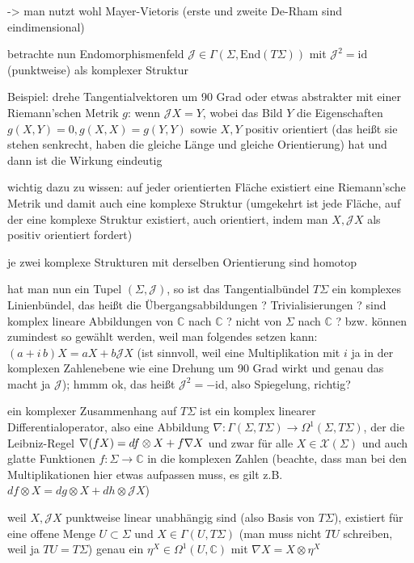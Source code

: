 \documentclass[../H_Analysis_main.tex]{subfiles}
\begin{document}
-> man nutzt wohl Mayer-Vietoris (erste und zweite De-Rham sind eindimensional)


betrachte nun Endomorphismenfeld $\mathcal{J} \in \Gamma(\Sigma, \text{End}(T\Sigma))$ mit $\mathcal{J}^2 = \text{id}$ (punktweise) als komplexer Struktur


Beispiel: drehe Tangentialvektoren um 90 Grad oder etwas abstrakter mit einer Riemann'schen Metrik $g$: wenn $\mathcal{J}X = Y$, wobei das Bild $Y$ die Eigenschaften $g(X, Y) = 0, g(X, X) = g(Y, Y)$ sowie $X, Y$ positiv orientiert (das heißt sie stehen senkrecht, haben die gleiche Länge und gleiche Orientierung) hat und dann ist die Wirkung eindeutig

wichtig dazu zu wissen: auf jeder orientierten Fläche existiert eine Riemann'sche Metrik und damit auch eine komplexe Struktur (umgekehrt ist jede Fläche, auf der eine komplexe Struktur existiert, auch orientiert, indem man $X, \mathcal{J}X$ als positiv orientiert fordert)

je zwei komplexe Strukturen mit derselben Orientierung sind homotop 


hat man nun ein Tupel $(\Sigma, \mathcal{J})$, so ist das Tangentialbündel $T\Sigma$ ein komplexes Linienbündel, das heißt die Übergangsabbildungen ? Trivialisierungen ? sind komplex lineare Abbildungen von $\mathbb{C}$ nach $\mathbb{C}$ ? nicht von $\Sigma$ nach $\mathbb{C}$ ? bzw. können zumindest so gewählt werden, weil man folgendes setzen kann: $(a + i \, b) X = a X + b \mathcal{J} X$ (ist sinnvoll, weil eine Multiplikation mit $i$ ja in der komplexen Zahlenebene wie eine Drehung um 90 Grad wirkt und genau das macht ja $\mathcal{J}$); hmmm ok, das heißt $\mathcal{J}^2 = - \text{id}$, also Spiegelung, richtig?


ein komplexer Zusammenhang auf $T\Sigma$ ist ein komplex linearer Differentialoperator, also eine Abbildung $\nabla: \Gamma(\Sigma, T\Sigma) \rightarrow \Omega^1(\Sigma, T\Sigma)$, der die Leibniz-Regel $\nabla\qty(f X) = df \otimes X + f \nabla X$ und zwar für alle $X \in \mathcal{X}(\Sigma)$ und auch glatte Funktionen $f: \Sigma \rightarrow \mathbb{C}$ in die komplexen Zahlen (beachte, dass man bei den Multiplikationen hier etwas aufpassen muss, es gilt z.B. $df \otimes X = dg \otimes X + dh \otimes \mathcal{J} X$)


weil $X, \mathcal{J}X$ punktweise linear unabhängig sind (also Basis von $T\Sigma$), existiert für eine offene Menge $U \subset \Sigma$ und $X \in \Gamma(U, T\Sigma)$ (man muss nicht $TU$ schreiben, weil ja $TU = T\Sigma$) genau ein $\eta^X \in \Omega^1(U, \mathbb{C})$ mit $\nabla X = X \otimes \eta^X$
\end{document}
